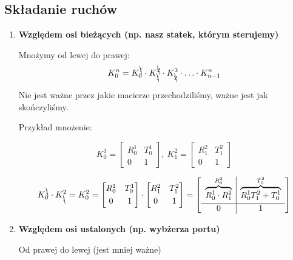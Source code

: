 \documentclass{article}
\begin{document}
\subsection{Składanie ruchów}

\begin{enumerate}
    \item {\bf Względem osi bieżących (np. nasz statek, którym sterujemy)}

          Mnożymy od lewej do prawej:
          \Large
          $$
              K_{0}^{n} = K_{0}^{\bcancel{1}}\cdot K_{\bcancel{1}}^{\bcancel{2}} \cdot K_{\bcancel{2}}^{3} \cdot \ldots \cdot K_{n-1}^{n}
          $$
          \normalsize

          Nie jest ważne przez jakie macierze przechodziliśmy, ważne jest jak skończyliśmy.


          Przykład mnożenie:

        \Large
          $$
              K_{0}^{1} =
              \begin{bmatrix}
                  R_{0}^{1} & T_{0}^{1} \\[0.3em]
                  0         & 1
              \end{bmatrix}
              , \
              K_{1}^{2} =
              \begin{bmatrix}
                  R_{1}^{2} & T_{1}^{2} \\[0.3em]
                  0         & 1
              \end{bmatrix}
          $$

          $$
              K_{0}^{\bcancel{1}}\cdot K_{\bcancel{1}}^{2} = K_{0}^{2} =
              \begin{bmatrix}
                  R_{0}^{1} & T_{0}^{1} \\[0.3em]
                  0         & 1
              \end{bmatrix}
              \cdot
              \begin{bmatrix}
                  R_{1}^{2} & T_{1}^{2} \\[0.3em]
                  0         & 1
              \end{bmatrix}
              =
              \begin{bmatrix}
                  \begin{array}{c|c}
                      \overbrace{R_{0}^{1}\cdot R_{1}^{2}}^{R_{0}^{2}} & \overbrace{R_{0}^{1}T_{1}^{2}+T_{0}^{1}}^{T_{0}^{2}} \\[0.3em]
                      \hline
                      0                                                & 1
                  \end{array}
              \end{bmatrix}
          $$
          \normalsize



    \item {\bf Względem osi ustalonych (np. wybżerza portu)}

          Od prawej do lewej (jest mniej ważne)

\end{enumerate}
\normalsize
\end{document}
